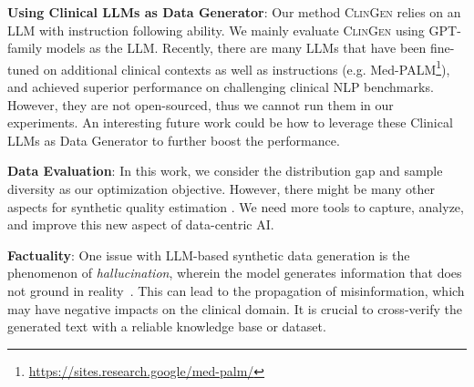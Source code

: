 \documentclass{article} %
\newcommand{\ours}{\textsc{ClinGen}\xspace}
\begin{document}
\textbf{Using Clinical LLMs as Data Generator}:
Our method {\ours} relies on an LLM with instruction following ability. We mainly evaluate {\ours} using GPT-family models as the LLM.
Recently, there are many LLMs that have been fine-tuned on additional clinical contexts as well as instructions (e.g. Med-PALM\footnote{\url{https://sites.research.google/med-palm/}}), and achieved superior performance on challenging clinical NLP benchmarks.
However, they are not open-sourced, thus we cannot run them in our experiments. An interesting future work could be how to leverage these Clinical LLMs as Data Generator  to further boost the performance.

\textbf{Data Evaluation}:
In this work, we consider the distribution gap and sample diversity as our optimization objective. However, there might be many other aspects for synthetic quality estimation \citep{pmlr-v162-alaa22a}. 
We need more tools to capture, analyze, and improve this new aspect of data-centric AI.


\textbf{Factuality}: One issue with LLM-based synthetic data generation is the phenomenon of \emph{hallucination}, wherein the model generates information that does not ground in reality~\citep{zhang2023siren}. This can lead to the propagation of misinformation, which may have negative impacts on the clinical domain.  
It is crucial to cross-verify the generated text with a reliable knowledge base or dataset. 
\end{document}
